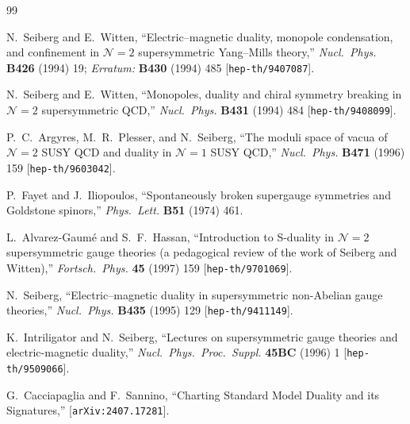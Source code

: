 \documentclass[11pt,a4paper]{article}
\begin{document}
\begin{thebibliography}{99}

  N.~Seiberg and E.~Witten,
  ``Electric--magnetic duality, monopole condensation, and confinement
  in $\mathcal{N}=2$ supersymmetric Yang--Mills theory,''
  \textit{Nucl.~Phys.} \textbf{B426} (1994) 19;
  \textit{Erratum:} \textbf{B430} (1994) 485
  [\texttt{hep-th/9407087}].

  N.~Seiberg and E.~Witten,
  ``Monopoles, duality and chiral symmetry breaking
  in $\mathcal{N}=2$ supersymmetric QCD,''
  \textit{Nucl.~Phys.} \textbf{B431} (1994) 484
  [\texttt{hep-th/9408099}].

  P.~C.~Argyres, M.~R.~Plesser, and N.~Seiberg,
  ``The moduli space of vacua of $\mathcal{N}=2$ SUSY QCD and duality
  in $\mathcal{N}=1$ SUSY QCD,''
  \textit{Nucl.~Phys.} \textbf{B471} (1996) 159
  [\texttt{hep-th/9603042}].

  P.~Fayet and J.~Iliopoulos,
  ``Spontaneously broken supergauge symmetries and Goldstone spinors,''
  \textit{Phys.~Lett.} \textbf{B51} (1974) 461.

  L.~Alvarez-Gaum\'e and S.~F.~Hassan,
  ``Introduction to S-duality in $\mathcal{N}=2$ supersymmetric gauge
  theories (a pedagogical review of the work of Seiberg and Witten),''
  \textit{Fortsch.~Phys.} \textbf{45} (1997) 159
  [\texttt{hep-th/9701069}].

  N.~Seiberg,
  ``Electric--magnetic duality in supersymmetric non-Abelian gauge
  theories,''
  \textit{Nucl.~Phys.} \textbf{B435} (1995) 129
  [\texttt{hep-th/9411149}].

  K.~Intriligator and N.~Seiberg,
  ``Lectures on supersymmetric gauge theories and electric-magnetic
  duality,''
  \textit{Nucl.~Phys.~Proc.~Suppl.} \textbf{45BC} (1996) 1
  [\texttt{hep-th/9509066}].

  G.~Cacciapaglia and F.~Sannino,
  ``Charting Standard Model Duality and its Signatures,''
  [\texttt{arXiv:2407.17281}].

\end{thebibliography}
\end{document}
